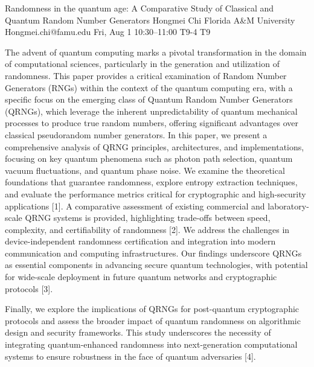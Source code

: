 \documentclass[12pt,lettersize,oneside]{book} %
\begin{document}
\begin{talk}
  {Randomness in the quantum age: A Comparative Study of Classical and Quantum Random Number Generators}%
  {Hongmei Chi}%
  {Florida A\&M University}%
  {Hongmei.chi@famu.edu}%
  {}%
  {}%
  {Fri, Aug 1 10:30--11:00}%
  {T9-4}%
  {T9}%
 
     
The advent of quantum computing marks a pivotal transformation in the domain of computational sciences, particularly in the generation and utilization of randomness. This paper provides a critical examination of Random Number Generators (RNGs) within the context of the quantum computing era, with a specific focus on the emerging class of Quantum Random Number Generators (QRNGs), which leverage the inherent unpredictability of quantum mechanical processes to produce true random numbers, offering significant advantages over classical pseudorandom number generators. 
In this paper, we present a comprehensive analysis of QRNG principles, architectures, and implementations, focusing on key quantum phenomena such as photon path selection, quantum vacuum fluctuations, and quantum phase noise. We examine the theoretical foundations that guarantee randomness, explore entropy extraction techniques, and evaluate the performance metrics critical for cryptographic and high-security applications [1]. A comparative assessment of existing commercial and laboratory-scale QRNG systems is provided, highlighting trade-offs between speed, complexity, and certifiability of randomness [2].  We address the challenges in device-independent randomness certification and integration into modern communication and computing infrastructures. Our findings underscore QRNGs as essential components in advancing secure quantum technologies, with potential for wide-scale deployment in future quantum networks and cryptographic protocols [3].

 Finally, we explore the implications of QRNGs for post-quantum cryptographic protocols and assess the broader impact of quantum randomness on algorithmic design and security frameworks. This study underscores the necessity of integrating quantum-enhanced randomness into next-generation computational systems to ensure robustness in the face of quantum adversaries [4].


\end{talk}
\end{document}
